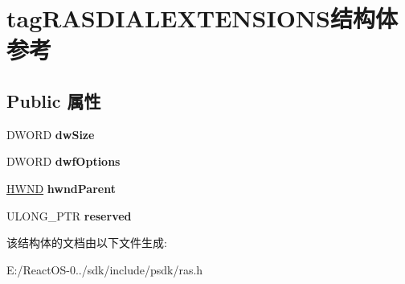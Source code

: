 \hypertarget{structtag_r_a_s_d_i_a_l_e_x_t_e_n_s_i_o_n_s}{}\section{tag\+R\+A\+S\+D\+I\+A\+L\+E\+X\+T\+E\+N\+S\+I\+O\+N\+S结构体 参考}
\label{structtag_r_a_s_d_i_a_l_e_x_t_e_n_s_i_o_n_s}
\subsection*{Public 属性}
\begin{DoxyCompactItemize}
\item 
\mbox{\label{structtag_r_a_s_d_i_a_l_e_x_t_e_n_s_i_o_n_s_a945a0e80c506e828ff3dc83ecd307dd5}} 
D\+W\+O\+RD {\bfseries dw\+Size}
\item 
\mbox{\label{structtag_r_a_s_d_i_a_l_e_x_t_e_n_s_i_o_n_s_a7ef5e3c86e91eb01a0b6c43d5018d21d}} 
D\+W\+O\+RD {\bfseries dwf\+Options}
\item 
\mbox{\label{structtag_r_a_s_d_i_a_l_e_x_t_e_n_s_i_o_n_s_a5aea023fb62c3be7c01adf1478e8f0b0}} 
\hyperlink{interfacevoid}{H\+W\+ND} {\bfseries hwnd\+Parent}
\item 
\mbox{\label{structtag_r_a_s_d_i_a_l_e_x_t_e_n_s_i_o_n_s_aab60067b43a0f2caa89b7357641c1119}} 
U\+L\+O\+N\+G\+\_\+\+P\+TR {\bfseries reserved}
\end{DoxyCompactItemize}


该结构体的文档由以下文件生成\+:\begin{DoxyCompactItemize}
\item 
E\+:/\+React\+O\+S-\/0../sdk/include/psdk/ras.\+h\end{DoxyCompactItemize}
